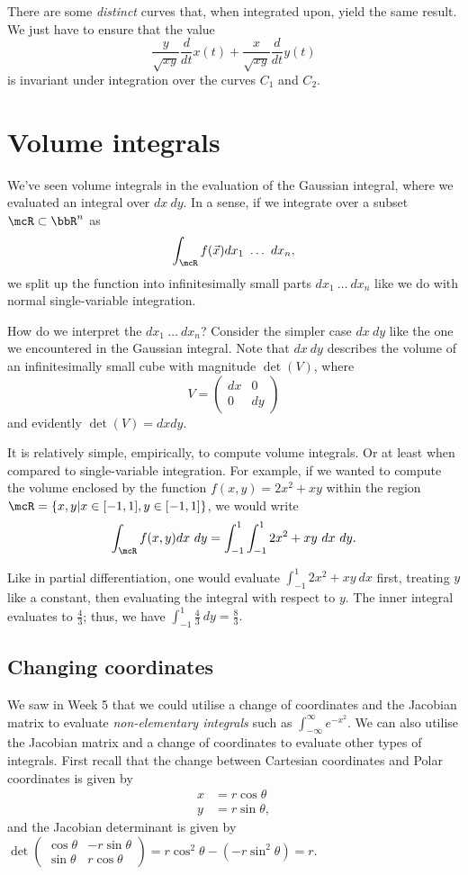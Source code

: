 \documentclass[a4paper, 12pt,oneside,openany]{book}
\begin{document}
There are some \emph{distinct} curves that, when integrated upon, yield the same result. We just have to ensure that the value $$\frac{y}{\sqrt{xy}} \frac{d}{dt} x(t) + \frac{x}{\sqrt{xy}} \frac{d}{dt} y(t)$$ is invariant under integration over the curves $C_1$ and $C_2$. 

\section{Volume integrals}

We've seen volume integrals in the evaluation of the Gaussian integral, where we evaluated an integral over $dx\ dy$. In a sense, if we integrate over a subset $\mcR \subset \bbR^n$ as $$\int_\mcR f(\vec{x}) dx_1 \ \dots \ dx_n,$$ we split up the function into infinitesimally small parts $dx_1 \ \dots\ dx_n$ like we do with normal single-variable integration. 

How do we interpret the $dx_1 \ \dots\ dx_n$? Consider the simpler case $dx\ dy$ like the one we encountered in the Gaussian integral. Note that $dx\ dy$ describes the volume of an infinitesimally small cube with magnitude $\det(V)$, where $$V = \begin{pmatrix} dx & 0 \\ 0 & dy \end{pmatrix}$$ and evidently $\det(V) = dx dy$. 

It is relatively simple, empirically, to compute volume integrals. Or at least when compared to single-variable integration. For example, if we wanted to compute the volume enclosed by the function $f(x, y) = 2x^2+xy$ within the region $\mcR = \{x, y | x \in [-1, 1], y \in [-1, 1]\}$, we would write $$\int_\mcR f(x, y) dx\ dy = \int_{-1}^1 \int_{-1}^1  2x^2+xy\ dx\ dy.$$

Like in partial differentiation, one would evaluate $\int_{-1}^1  2x^2+xy\ dx$ first, treating $y$ like a constant, then evaluating the integral with respect to $y$. The inner integral evaluates to $\frac{4}{3}$; thus, we have $\int_{-1}^1 \frac{4}{3}\ dy=\frac{8}{3}.$

\subsection{Changing coordinates}

We saw in Week 5 that we could utilise a change of coordinates and the Jacobian matrix to evaluate \emph{non-elementary integrals} such as $\int_{-\infty}^\infty e^{-x^2}$. We can also utilise the Jacobian matrix and a change of coordinates to evaluate other types of integrals. First recall that the change between Cartesian coordinates and Polar coordinates is given by \begin{align*} x &= r \cos \theta \\ y &= r \sin \theta, \end{align*} and the Jacobian determinant is given by $\det\begin{pmatrix} \cos \theta & -r\sin \theta \\ \sin \theta & r\cos\theta \end{pmatrix}=r\cos^2\theta-(-r\sin^2\theta) = r.$
\end{document}
